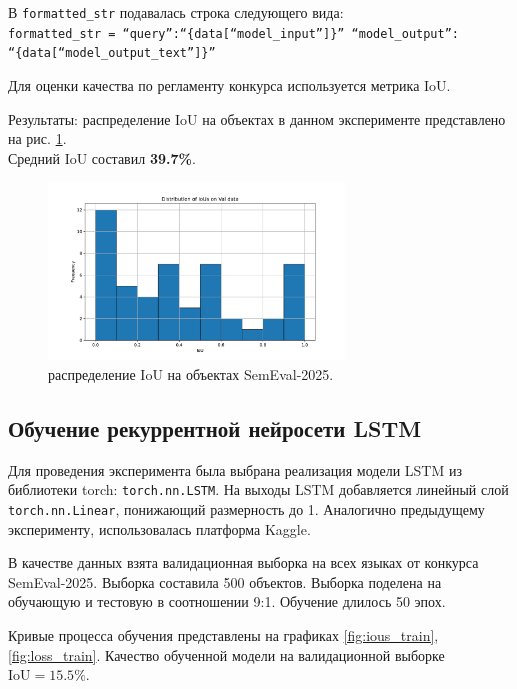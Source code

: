 \documentclass[12pt]{article}
\begin{document}
В \texttt{formatted\_str} подавалась строка следующего вида:\\
\texttt{formatted\_str = ``query'':``\{data[``model\_input'']\}'' ``model\_output'':\\``\{data[``model\_output\_text'']\}''}

Для оценки качества по регламенту конкурса используется метрика IoU. 

Результаты: распределение IoU на объектах в данном эксперименте представлено на рис. \ref{fig:ious_histogram}.\\ Средний IoU составил \textbf{39.7\%}.

\begin{figure}[h]
    \centering
    \includegraphics[width=0.7\textwidth]{images/ious_histogram.pdf}
    \caption{распределение IoU на объектах SemEval-2025.}
    \label{fig:ious_histogram}
\end{figure}

\subsection{Обучение рекуррентной нейросети LSTM}
Для проведения эксперимента была выбрана реализация модели LSTM из библиотеки torch: \texttt{torch.nn.LSTM}. На выходы LSTM добавляется линейный слой \texttt{torch.nn.Linear}, понижающий размерность до 1. Аналогично предыдущему эксперименту, использовалась платформа Kaggle. 

В качестве данных взята валидационная выборка на всех языках от конкурса SemEval-2025. Выборка составила 500 объектов. Выборка поделена на обучающую и тестовую в соотношении 9:1. Обучение длилось 50 эпох. 

Кривые процесса обучения представлены на графиках \ref{fig:ious_train}, \ref{fig:loss_train}. Качество обученной модели на валидационной выборке  $\text{IoU}=15.5\%$.
\end{document}
